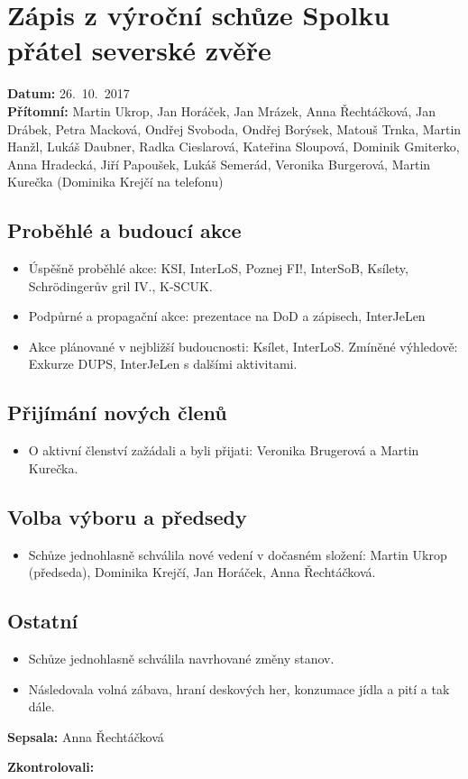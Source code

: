\documentclass[11pt,a4paper]{article}
\begin{document}
\section*{Zápis z výroční schůze Spolku přátel severské zvěře}
\textbf{Datum:} 26.~10.~2017\\
\textbf{Přítomní:} Martin Ukrop, Jan Horáček, Jan Mrázek, Anna Řechtáčková, Jan Drábek, Petra Macková, Ondřej Svoboda, Ondřej Borýsek, Matouš Trnka, Martin Hanžl, Lukáš Daubner, Radka Cieslarová, Kateřina Sloupová, Dominik Gmiterko, Anna Hradecká, Jiří Papoušek, Lukáš Semerád, Veronika Burgerová, Martin Kurečka (Dominika Krejčí na telefonu)

\subsection*{Proběhlé a budoucí akce}
\begin{itemize}[itemsep=0pt]
\item Úspěšně proběhlé akce: KSI, InterLoS, Poznej FI!, InterSoB, Ksílety, Schrödingerův gril IV., K-SCUK.
\item Podpůrné a propagační akce: prezentace na DoD a zápisech, InterJeLen
\item Akce plánované v nejbližší budoucnosti: Ksílet, InterLoS. Zmíněné výhledově: Exkurze DUPS, InterJeLen s dalšími aktivitami.
\end{itemize}

\subsection*{Přijímání nových členů}
\begin{itemize}[itemsep=0pt]
\item O aktivní členství zažádali a byli přijati: Veronika Brugerová a Martin Kurečka.
\end{itemize}

\subsection*{Volba výboru a předsedy}
\begin{itemize}[itemsep=0pt]
\item Schůze jednohlasně schválila nové vedení v dočasném složení: Martin Ukrop (předseda), Dominika Krejčí, Jan Horáček, Anna Řechtáčková.
\end{itemize}

\subsection*{Ostatní}
\begin{itemize}[itemsep=0pt]
\item Schůze jednohlasně schválila navrhované změny stanov.
\item Následovala volná zábava, hraní deskových her, konzumace jídla a pití a tak dále.
\end{itemize}

\textbf{Sepsala:} Anna Řechtáčková

\textbf{Zkontrolovali:} 
\end{document}
